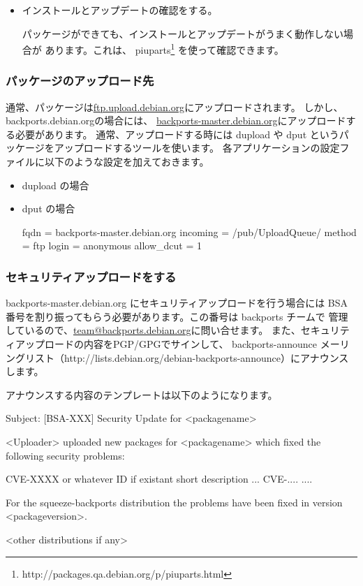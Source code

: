 \documentclass[mingoth,a4paper]{jsarticle}
\begin{document}
\begin{itemize}
\item インストールとアップデートの確認をする。

パッケージができても、インストールとアップデートがうまく動作しない場合が
あります。これは、
piuparts\footnote{http://packages.qa.debian.org/p/piuparts.html}
を使って確認できます。

\end{itemize}

\subsubsection{パッケージのアップロード先}
通常、パッケージは\url{ftp.upload.debian.org}にアップロードされます。
しかし、backports.debian.orgの場合には、
\url{backports-master.debian.org}にアップロードする必要があります。
通常、アップロードする時には dupload や dput
というパッケージをアップロードするツールを使います。
各アプリケーションの設定ファイルに以下のような設定を加えておきます。

\begin{itemize}
\item dupload の場合

\item dput の場合
\begin{commandline}
[bpo]
fqdn = backports-master.debian.org
incoming = /pub/UploadQueue/
method = ftp
login = anonymous
allow_dcut = 1
\end{commandline}
\end{itemize}

\subsubsection{セキュリティアップロードをする}
backports-master.debian.org にセキュリティアップロードを行う場合には
BSA 番号を割り振ってもらう必要があります。この番号は backports チームで
管理しているので、\url{team@backports.debian.org}に問い合せます。
また、セキュリティアップロードの内容をPGP/GPGでサインして、
backports-announce メーリングリスト（http://lists.debian.org/debian-backports-announce）にアナウンスします。

アナウンスする内容のテンプレートは以下のようになります。
\begin{commandline}
Subject: [BSA-XXX] Security Update for <packagename>

<Uploader> uploaded new packages for <packagename> which fixed the
following security problems:

CVE-XXXX or whatever ID if existant
  short description 
  ...
CVE-.... 
  ....

For the squeeze-backports distribution the problems have been fixed in
version <packageversion>.

<other distributions if any> 
\end{commandline}
\end{document}
